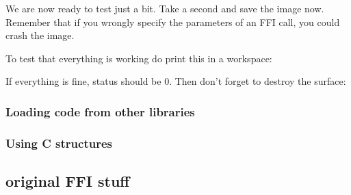 \documentclass[a4paper,10pt,twoside]{book}
\begin{document}
We are now ready to test just a bit. Take a second and save the
image now. Remember that if you wrongly specify the parameters
of an FFI call, you could crash the image.

To test that everything is working do print this in a workspace:


If everything is fine, status should be 0. Then don't forget
to destroy the surface:


\subsubsection{Loading code from other libraries}

\subsubsection{Using C structures}

% 
% 
% 


\subsection{original FFI stuff}
\end{document}
